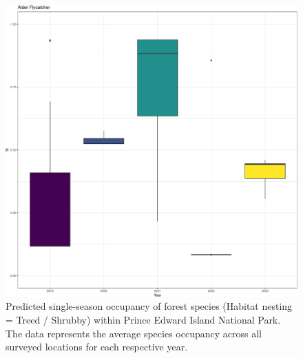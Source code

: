 \documentclass[
  letterpaper,
  DIV=11,
  numbers=noendperiod,
  oneside]{scrartcl}
\begin{document}
\begin{figure}

{\centering \includegraphics{peinp_files/figure-pdf/fig-spp-occ-tss-1.pdf}

}

\caption{\label{fig-spp-occ-tss}Predicted single-season occupancy of
forest species (Habitat nesting = Treed / Shrubby) within Prince Edward
Island National Park. The data represents the average species occupancy
across all surveyed locations for each respective year.}

\end{figure}
\end{document}

